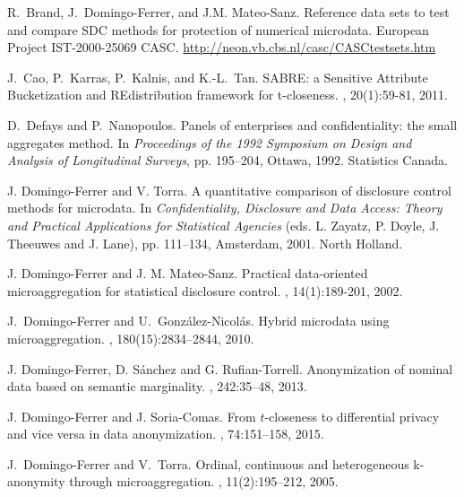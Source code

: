 \documentclass[10pt,journal,compsoc]{IEEEtran}
\theoremstyle{definition}
\theoremstyle{plain}
\begin{document}
\begin{thebibliography}{10}
	
	R.~Brand, J.~Domingo-Ferrer, and J.M. Mateo-Sanz.
	\newblock Reference data sets to test and compare SDC methods for protection of
	numerical microdata.
	\newblock European Project IST-2000-25069 CASC.
\url{http://neon.vb.cbs.nl/casc/CASCtestsets.htm}

	J.~Cao, P.~Karras, P.~Kalnis, and K.-L.~Tan. 
	\newblock SABRE: a Sensitive Attribute Bucketization and REdistribution framework for t-closeness. 
	, 20(1):59-81, 2011.
	
	D.~Defays and P.~Nanopoulos.
	\newblock Panels of enterprises and confidentiality: the small aggregates
	method.
	\newblock In {\em Proceedings of the 1992 Symposium on Design and Analysis of
		Longitudinal Surveys}, pp. 195--204, Ottawa, 1992. Statistics Canada.

 J. Domingo-Ferrer and V. Torra.
\newblock A quantitative comparison of disclosure control methods for 
microdata.
\newblock In {\em Confidentiality, Disclosure and Data Access:
Theory and Practical Applications for Statistical Agencies}
(eds. L. Zayatz, P. Doyle, J. Theeuwes and J. Lane), pp. 111--134,
Amsterdam, 2001. North Holland.

 J. Domingo-Ferrer and J. M. Mateo-Sanz.
\newblock Practical data-oriented microaggregation for statistical
disclosure control.
,
14(1):189-201, 2002.
	
	J.~Domingo-Ferrer and U.~Gonz\'alez-Nicol\'as.
	\newblock Hybrid microdata using microaggregation.
	, 180(15):2834--2844, 2010.

 J. Domingo-Ferrer, D. S\'anchez and G. Rufian-Torrell.
\newblock Anonymization of nominal data based on semantic marginality.
, 242:35--48, 2013.

 J. Domingo-Ferrer and J. Soria-Comas.
\newblock From $t$-closeness to differential privacy and vice versa
in data anonymization.
, 74:151--158, 2015.
	
	J.~Domingo-Ferrer and V.~Torra.
	\newblock Ordinal, continuous and heterogeneous k-anonymity through
	microaggregation.
	, 11(2):195--212, 2005.


\end{thebibliography}
\end{document}
